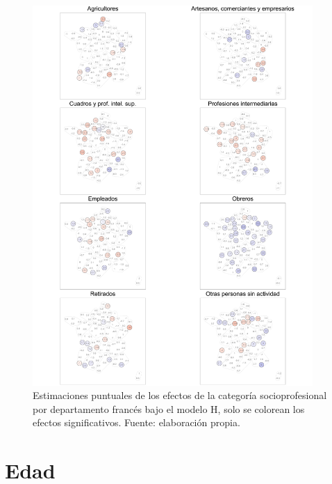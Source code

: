 \begin{figure}[H]
	\centering
	\includegraphics[width = 0.95\textwidth]{Figs/Efectos/Dorling_Efectos_Cat_Socioprof_Modelo_H}
	\caption{Estimaciones puntuales de los efectos de la categoría socioprofesional por departamento francés bajo el modelo H, solo se colorean los efectos significativos. Fuente: elaboración propia.}
	\label{fig:Dorling_Efectos_Cat_Socioprof}
\end{figure}

\section{Edad}

